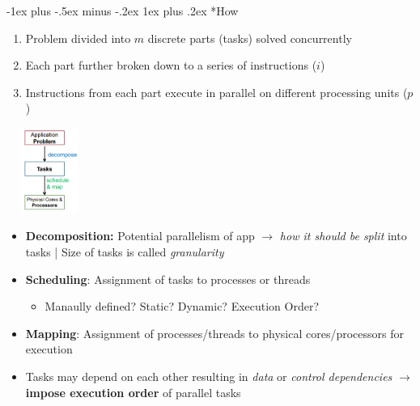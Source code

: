 \documentclass[10pt,landscape]{article}
\makeatletter
\renewcommand{\subsubsection}{\@startsection{subsubsection}{3}{0mm}%
                                {-1ex plus -.5ex minus -.2ex}%
                                {1ex plus .2ex}%
                                {\normalfont\small\bfseries}}
\makeatother
\begin{document}
\begin{multicols*}{3}
\subsubsection*{How}
\begin{multicols*}{1}
    \begin{enumerate}[topsep=0pt,noitemsep,wide=0pt, leftmargin=\dimexpr\labelwidth + 2\labelsep\relax]
        \item Problem divided into $m$ discrete parts (tasks) solved concurrently
        \item Each part further broken down to a series of instructions ($i$)
        \item Instructions from each part execute in parallel on different processing units ($p$)
    \end{enumerate}
    \columnbreak
    \includegraphics*[width=2.8cm, height=2.8cm]{images/basicsofparallelcomputing.png}
\end{multicols*}

\begin{itemize}[topsep=0pt,noitemsep,wide=0pt, leftmargin=\dimexpr{} + 2\relax]
    \item \textbf{Decomposition:} Potential parallelism of app $\rightarrow$ \textit{how it should be split} into tasks | Size of tasks is called \textit{granularity} 
    \item \textbf{Scheduling}: Assignment of tasks to processes or threads
    \begin{itemize}[topsep=0pt,noitemsep,wide=0pt, leftmargin=\dimexpr{} + 2\relax]
        \item Manaully defined? Static? Dynamic? Execution Order?
    \end{itemize}
    \item \textbf{Mapping}: Assignment of processes/threads to physical cores/processors for execution
    \item Tasks may depend on each other resulting in \textit{data} or \textit{control dependencies} $\rightarrow$ \textbf{impose execution order} of parallel tasks
\end{itemize}


\end{multicols*}
\end{document}
